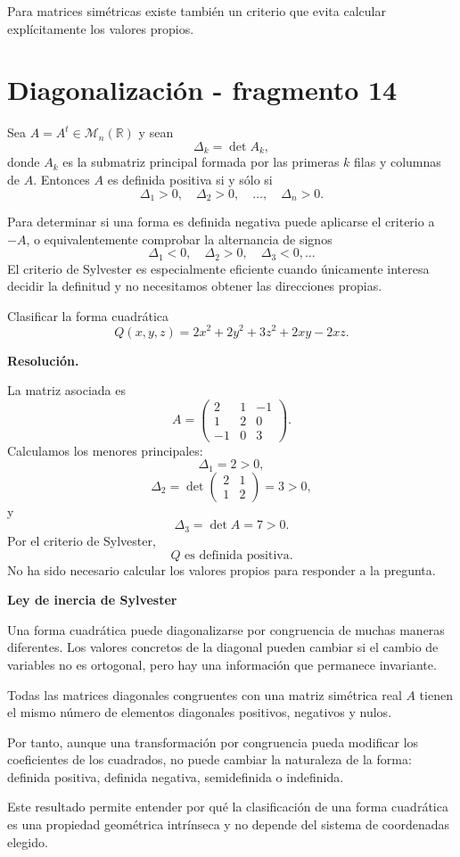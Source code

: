 Para matrices simétricas existe también un criterio que evita calcular explícitamente los valores propios.


\section{Diagonalización - fragmento 14}
\begin{theorem}
Sea $A=A^t\in\mathcal M_n(\mathbb{R})$ y sean
\[
\Delta_k=\det A_k,
\]
donde $A_k$ es la submatriz principal formada por las primeras $k$ filas y columnas de $A$. Entonces $A$ es definida positiva si y sólo si
\[
\Delta_1>0,\quad\Delta_2>0,\quad\ldots,\quad\Delta_n>0.
\]
\end{theorem}

Para determinar si una forma es definida negativa puede aplicarse el criterio a $-A$, o equivalentemente comprobar la alternancia de signos
\[
\Delta_1<0,\quad\Delta_2>0,\quad\Delta_3<0,\ldots
\]
El criterio de Sylvester es especialmente eficiente cuando únicamente interesa decidir la definitud y no necesitamos obtener las direcciones propias.

\begin{solvedexercise}
Clasificar la forma cuadrática
\[
Q(x,y,z)=2x^2+2y^2+3z^2+2xy-2xz.
\]

\textbf{Resolución.}\par\smallskip
La matriz asociada es
\[
A=\begin{pmatrix}
2&1&-1\\
1&2&0\\
-1&0&3
\end{pmatrix}.
\]
Calculamos los menores principales:
\[
\Delta_1=2>0,
\]
\[
\Delta_2=\det\begin{pmatrix}2&1\\1&2\end{pmatrix}=3>0,
\]
y
\[
\Delta_3=\det A=7>0.
\]
Por el criterio de Sylvester,
\[
\boxed{Q\text{ es definida positiva}.}
\]
No ha sido necesario calcular los valores propios para responder a la pregunta.
\end{solvedexercise}

\textbf{Ley de inercia de Sylvester}

Una forma cuadrática puede diagonalizarse por congruencia de muchas maneras diferentes. Los valores concretos de la diagonal pueden cambiar si el cambio de variables no es ortogonal, pero hay una información que permanece invariante.

\begin{theorem}
Todas las matrices diagonales congruentes con una matriz simétrica real $A$ tienen el mismo número de elementos diagonales positivos, negativos y nulos.
\end{theorem}

Por tanto, aunque una transformación por congruencia pueda modificar los coeficientes de los cuadrados, no puede cambiar la naturaleza de la forma: definida positiva, definida negativa, semidefinida o indefinida.

Este resultado permite entender por qué la clasificación de una forma cuadrática es una propiedad geométrica intrínseca y no depende del sistema de coordenadas elegido.
